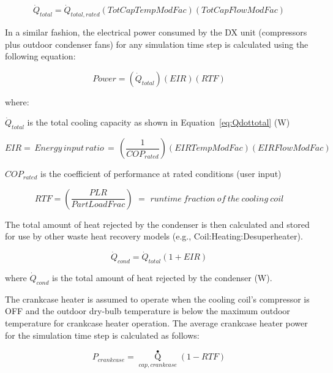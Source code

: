 \begin{equation}
{\dot{Q}_{total}} = {\dot{Q}_{total,rated}}\left( {TotCapTempModFac} \right)\left( {TotCapFlowModFac} \right)
\label{eq:Qdottotal}
\end{equation}

In a similar fashion, the electrical power consumed by the DX unit (compressors plus outdoor condenser fans) for any simulation time step is calculated using the following equation:

\begin{equation}
Power = \left( {{\dot{Q}_{total}}} \right)\left( {EIR} \right)\left( {RTF} \right)
\label{eq:CoilPower-456}
\end{equation}

where:

\(\dot{Q}_{total}\) is the total cooling capacity as shown in Equation~\ref{eq:Qdottotal} (W)

\begin{equation}
EIR = \,Energy\,input\,ratio\, = \,\left( {\frac{1}{{CO{P_{rated}}}}} \right)\left( {EIRTempModFac} \right)\left( {EIRFlowModFac} \right)
\end{equation}

\(CO{P_{rated}}\) is the coefficient of performance at rated conditions (user input)

\begin{equation}
RTF{\mathrm{ }} = {\mathrm{ }}\left( {{\frac{{PLR}}{{PartLoadFrac}}}} \right)\,\, = \,\,runtime~fraction~of~the~cooling~coil
\end{equation}

The total amount of heat rejected by the condenser is then calculated and stored for use by other waste heat recovery models (e.g., Coil:Heating:Desuperheater).

\begin{equation}
{\dot{Q}_{cond}} = {\dot{Q}_{total}}\left( {1 + EIR} \right)
\end{equation}

where \(\dot{Q}_{cond}\) is the total amount of heat rejected by the condenser (W).

The crankcase heater is assumed to operate when the cooling coil's compressor is OFF and the outdoor dry-bulb temperature is below the maximum outdoor temperature for crankcase heater operation. The average crankcase heater power for the simulation time step is calculated as follows:

\begin{equation}
{P_{crankcase}} = {\mathop Q\limits^ \bullet_{cap,crankcase}}\left( {1 - RTF} \right)
\end{equation}

